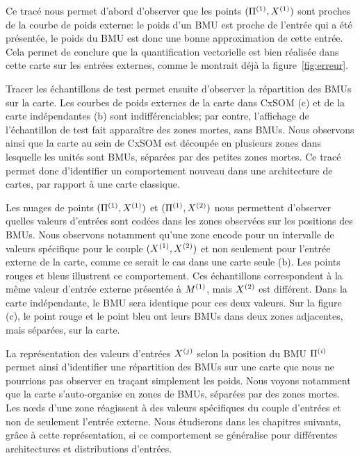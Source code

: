 \documentclass[../main]{subfiles}
\begin{document}
Ce tracé nous permet d'abord d'observer que les points $(\Pi^{({1})},X^{({1})})$ sont proches de la courbe de poids externe: le poids d'un BMU est proche de l'entrée qui a été présentée, le poids du BMU est donc une bonne approximation de cette entrée. Cela permet de conclure que la quantification vectorielle est bien réalisée dans cette carte sur les entrées externes, comme le montrait déjà la figure~\ref{fig:erreur}.

Tracer les échantillons de test permet ensuite d'observer la répartition des BMUs sur la carte. Les courbes de poids externes de la carte dans CxSOM (c) et de la carte indépendantes (b) sont indifférenciables; par contre, l'affichage de l'échantillon de test fait apparaître des zones mortes, sans BMUs. Nous observons ainsi que la carte au sein de CxSOM est découpée en plusieurs zones dans lesquelle les unités sont BMUs, séparées par des petites zones mortes. Ce tracé permet donc d'identifier un comportement nouveau dans une architecture de cartes, par rapport à une carte classique.

Les nuages de points $(\Pi^{({1})},X^{({1})})$ et $(\Pi^{({1})},X^{({2})})$ nous permettent d'observer quelles valeurs d'entrées sont codées dans les zones observées sur les positions des BMUs.
Nous observons notamment qu'une zone encode pour un intervalle de valeurs spécifique pour le couple $(X^{({1})},X^{({2})})$ et non seulement pour l'entrée externe de la carte, comme ce serait le cas dans une carte seule (b). Les points rouges et bleus illustrent ce comportement.
Ces échantillons correspondent à la même valeur d'entrée externe présentée à $M^{({1})}$, mais $X^{({2})}$ est différent.
Dans la carte indépendante, le BMU sera identique pour ces deux valeurs.
Sur la figure (c), le point rouge et le point bleu ont leurs BMUs dans deux zones adjacentes, mais séparées, sur la carte.

La représentation des valeurs d'entrées $X^{({j})}$ selon la position du BMU $\Pi^{({i})}$ permet ainsi d'identifier une répartition des BMUs sur une carte que nous ne pourrions pas observer en traçant simplement les poids.
Nous voyons notamment que la carte s'auto-organise en zones de BMUs, séparées par des zones mortes.
Les n\oe{}ds d'une zone réagissent à des valeurs spécifiques du couple d'entrées et non de seulement l'entrée externe.
Nous étudierons dans les chapitres suivants, grâce à cette représentation, si ce comportement se généralise pour différentes architectures et distributions d'entrées.
\end{document}
